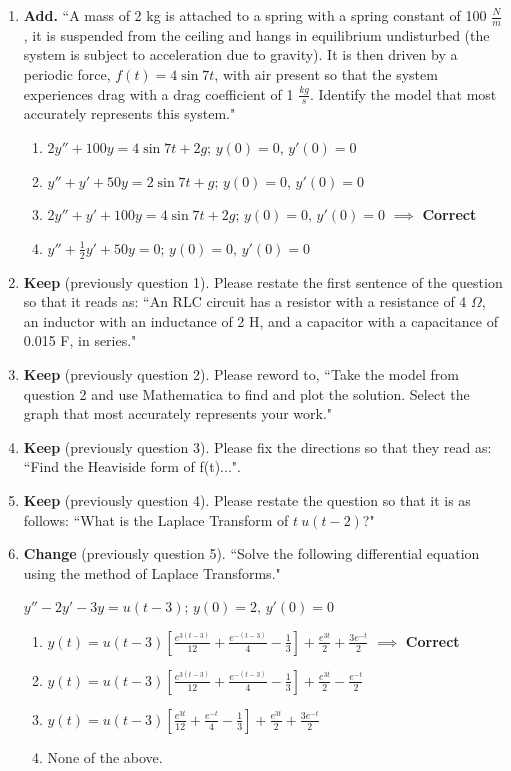 \documentclass[11pt]{article}
\begin{document}
\begin{enumerate}
	\item \textbf{Add.} ``A mass of 2 kg is attached to a spring with a spring constant of 100 $\frac{N}{m}$, it is suspended from the ceiling and hangs in equilibrium undisturbed (the system is subject to acceleration due to gravity). It is then driven by a periodic force, $f(t)=4\sin{7t}$, with air present so that the system experiences drag with a drag coefficient of 1 $\frac{kg}{s}$. Identify the model that most accurately represents this system."
		\begin{enumerate}
			\item $2y''+100y=4\sin{7t}+2g;\, y(0)=0,\, y'(0)=0$
			\item $y''+y'+50y=2\sin{7t}+g;\, y(0)=0,\, y'(0)=0$
			\item $2y''+y'+100y=4\sin{7t}+2g;\, y(0)=0,\, y'(0)=0$ $\implies$ \textbf{Correct}
			\item $y''+\frac{1}{2}y'+50y=0;\, y(0)=0,\, y'(0)=0$
		\end{enumerate}
	\item \textbf{Keep} (previously question 1). Please restate the first sentence of the question so that it reads as: ``An RLC circuit has a resistor with a resistance of 4 $\Omega$, an inductor with an inductance of 2 H, and a capacitor with a capacitance of 0.015 F, in series."
	
	\item \textbf{Keep} (previously question 2). Please reword to, ``Take the model from question 2 and use Mathematica to find and plot the solution. Select the graph that most accurately represents your work."
	
	\item \textbf{Keep} (previously question 3). Please fix the directions so that they read as: ``Find the Heaviside form of f(t)...".
	
	\item \textbf{Keep} (previously question 4). Please restate the question so that it is as follows: ``What is the Laplace Transform of $t\ u(t-2)$?"
	
	\item \textbf{Change} (previously question 5). ``Solve the following differential equation using the method of Laplace Transforms."
	
	$y''-2y'-3y=u(t-3);\, y(0)=2,\, y'(0)=0$
		\begin{enumerate}
			\item $y(t)=u(t-3)\left[\frac{e^{3(t-3)}}{12}+\frac{e^{-(t-3)}}{4}-\frac{1}{3}\right]+\frac{e^{3t}}{2}+\frac{3e^{-t}}{2}$ $\implies$ \textbf{Correct}
			\item $y(t)=u(t-3)\left[\frac{e^{3(t-3)}}{12}+\frac{e^{-(t-3)}}{4}-\frac{1}{3}\right]+\frac{e^{3t}}{2}-\frac{e^{-t}}{2}$
			\item $y(t)=u(t-3)\left[\frac{e^{3t}}{12}+\frac{e^{-t}}{4}-\frac{1}{3}\right]+\frac{e^{3t}}{2}+\frac{3e^{-t}}{2}$
			\item None of the above.
		\end{enumerate}
\end{enumerate}
\end{document}
